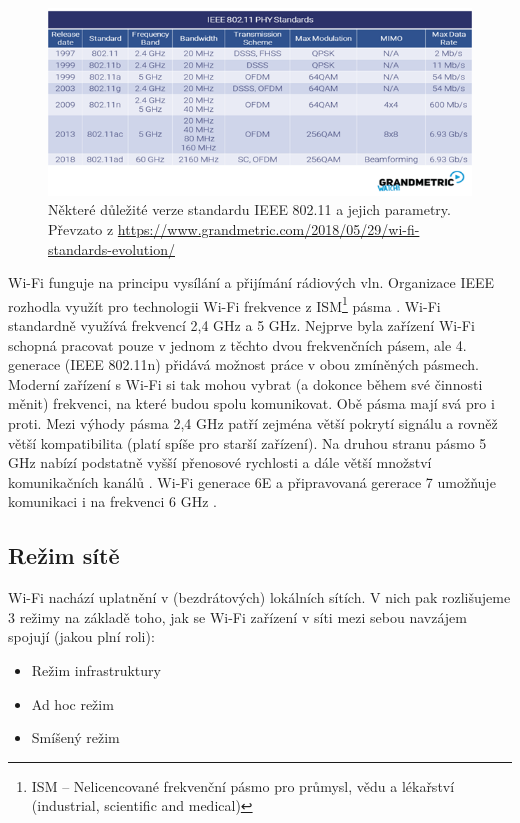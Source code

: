 \begin{figure}[hbt]
	\centering
	\includegraphics[scale=0.95]{obrazky/wifi-standards.png}
	\caption{Některé důležité verze standardu IEEE 802.11 a jejich parametry. Převzato z \url{https://www.grandmetric.com/2018/05/29/wi-fi-standards-evolution/}}
	\label{wifi-standards}
\end{figure}
Wi-Fi funguje na principu vysílání a přijímání rádiových vln. Organizace IEEE rozhodla využít pro technologii Wi-Fi frekvence z ISM\footnote{ISM -- Nelicencované frekvenční pásmo pro průmysl, vědu a lékařství (industrial, scientific and medical)} pásma \cite{BezdratoveSite}. Wi-Fi standardně využívá frekvencí 2,4 GHz a 5 GHz. Nejprve byla zařízení Wi-Fi schopná pracovat pouze v jednom z těchto dvou frekvenčních pásem, ale 4. generace (IEEE 802.11n) přidává možnost práce v obou zmíněných pásmech. Moderní zařízení s Wi-Fi si tak mohou vybrat (a dokonce během své činnosti měnit) frekvenci, na které budou spolu komunikovat.
Obě pásma mají svá pro i proti. Mezi výhody pásma 2,4 GHz patří zejména větší pokrytí signálu a rovněž větší kompatibilita (platí spíše pro starší zařízení). Na druhou stranu pásmo 5 GHz nabízí podstatně vyšší přenosové rychlosti a dále větší množství komunikačních kanálů \cite{WifiFrequencyBands}. Wi-Fi generace 6E a připravovaná gererace 7 umožňuje komunikaci i na frekvenci 6 GHz \cite{WiFi7}.

\subsection*{Režim sítě}
Wi-Fi nachází uplatnění v (bezdrátových) lokálních sítích. V nich pak rozlišujeme 3 režimy na základě toho, jak se Wi-Fi zařízení v síti mezi sebou navzájem spojují (jakou plní roli):
\begin{itemize}
    \item Režim infrastruktury
    \item Ad hoc režim
    \item Smíšený režim
\end{itemize}

